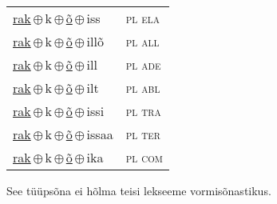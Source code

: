 \begin{minipage}{\textwidth}
\begin{sideways}
\begin{tabular}{l l}
\underline{rak}\,$\oplus$\,k\,$\oplus$\,\underline{õ}\,$\oplus$\,iss & \textsc{ pl ela } \\
\underline{rak}\,$\oplus$\,k\,$\oplus$\,\underline{õ}\,$\oplus$\,illõ & \textsc{ pl all } \\
\underline{rak}\,$\oplus$\,k\,$\oplus$\,\underline{õ}\,$\oplus$\,ill & \textsc{ pl ade } \\
\underline{rak}\,$\oplus$\,k\,$\oplus$\,\underline{õ}\,$\oplus$\,ilt & \textsc{ pl abl } \\
\underline{rak}\,$\oplus$\,k\,$\oplus$\,\underline{õ}\,$\oplus$\,issi & \textsc{ pl tra } \\
\underline{rak}\,$\oplus$\,k\,$\oplus$\,\underline{õ}\,$\oplus$\,issaa & \textsc{ pl ter } \\
\underline{rak}\,$\oplus$\,k\,$\oplus$\,\underline{õ}\,$\oplus$\,ika & \textsc{ pl com } \\
\end{tabular}
\end{sideways}
\label{tab:tüüpsõnamall-rakõ}

\end{minipage}

 
\vspace{1em}
\noindent See tüüpsõna ei hõlma teisi lekseeme vormi\-sõnastikus.
